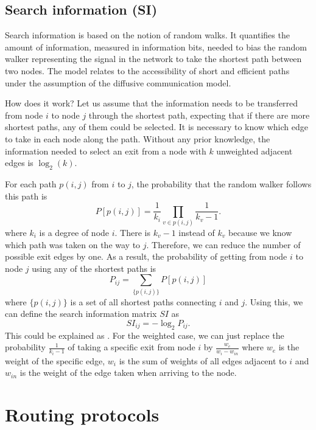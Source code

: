 \subsection{Search information (SI)}

Search information is based on the notion of random walks. It quantifies the amount of information, measured in information bits, needed to bias the random walker representing the signal in the network to take the shortest path between two nodes. The model relates to the accessibility of short and efficient paths under the assumption of the diffusive communication model. \cite{seguin_communication_2023,seguin_brain_2023}

How does it work? Let us assume that the information needs to be transferred from node $i$ to node $j$ through the shortest path, expecting that if there are more shortest paths, any of them could be selected. It is necessary to know which edge to take in each node along the path. Without any prior knowledge, the information needed to select an exit from a node with $k$ unweighted adjacent edges is $\log_2(k)$. \cite{rosvall_searchability_2005,rosvall_networks_2005}

For each path $p(i,j)$ from $i$ to $j$, the probability that the random walker follows this path is 
$$
P[p(i,j)] = \frac{1}{k_i}\prod_{v \in p(i,j)}\frac{1}{k_v-1}.
$$
where $k_i$ is a degree of node $i$. There is $k_v-1$ instead of $k_v$ because we know which path was taken on the way to $j$. Therefore, we can reduce the number of possible exit edges by one. As a result, the probability of getting from node $i$ to node $j$ using any of the shortest paths is 
$$
P_{ij} = \sum_{\{p(i,j)\}}P[p(i,j)] 
$$
where $\{p(i,j)\}$ is a set of all shortest paths connecting $i$ and $j$. Using this, we can define the search information matrix $SI$ as 
$$
SI_{ij}=-\log_2 P_{ij}.
$$
This could be explained as . For the weighted case, we can just replace the probability $\frac{1}{k_i-1}$ of taking a specific exit from node $i$ by $\frac{w_e}{w_i-w_{in}}$ where $w_e$ is the weight of the specific edge, $w_i$ is the sum of weights of all edges adjacent to $i$ and $w_{in}$ is the weight of the edge taken when arriving to the node. 

\section{Routing protocols}

